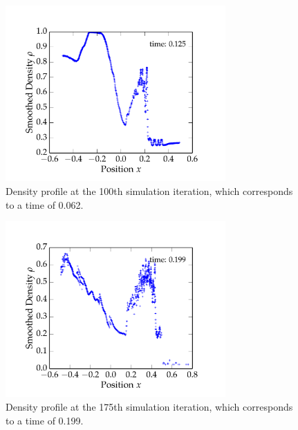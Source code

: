 \documentclass{article}
\begin{document}
\begin{spacing}{1.1}
\begin{figure}[H]
 \centering
 \hspace{0cm} \includegraphics[width=0.75\textwidth]{figs/fig_100.pdf}
 \caption{Density profile at the 100th simulation iteration, which corresponds to a time of 0.062.}
 \label{fig_100}
\end{figure} 

\begin{figure}[H]
 \centering
 \hspace{0cm} \includegraphics[width=0.75\textwidth]{figs/fig_175.pdf}
 \caption{Density profile at the 175th simulation iteration, which corresponds to a time of 0.199.}
 \label{fig_175}
\end{figure} 


\end{spacing}
\end{document}
